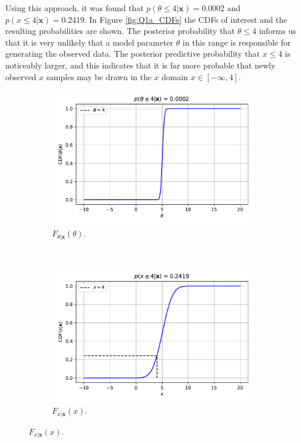 \documentclass{article}
\begin{document}
Using this approach, it was found that $p(\theta \leq 4 \vert \mathbf{x}) = 0.0002$ and $p(x \leq 4 \vert \mathbf{x}) = 0.2419$. In Figure \ref{fig:Q1a_CDFs} the CDFs of interest and the resulting probabilities are shown. The posterior probability that $\theta \leq 4$ informs us that it is very unlikely that a model parameter $\theta$ in this range is responsible for generating the observed data. The posterior predictive probability that $x \leq 4$ is noticeably larger, and this indicates that it is far more probable that newly observed $x$ samples may be drawn in the $x$ domain $x \in [-\infty, 4]$. 
\begin{figure}
     \centering
     \begin{subfigure}[b]{0.45\textwidth}
         \centering
         \includegraphics[width=\textwidth]{Q1a_7a.pdf}
         \caption{$F_{\theta \vert \mathbf{x}}(\theta)$.}
     \end{subfigure}
     ~
     \begin{subfigure}[b]{0.45\textwidth}
         \centering
         \includegraphics[width=\textwidth]{Q1a_7b.pdf}
         \caption{$F_{x \vert \mathbf{x}}(x)$.}
     \end{subfigure}
     

\end{figure}
\end{document}
